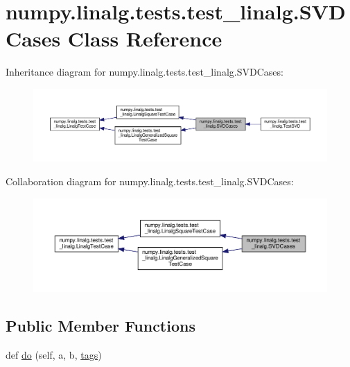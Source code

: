 \hypertarget{classnumpy_1_1linalg_1_1tests_1_1test__linalg_1_1SVDCases}{}\section{numpy.\+linalg.\+tests.\+test\+\_\+linalg.\+S\+V\+D\+Cases Class Reference}
\label{classnumpy_1_1linalg_1_1tests_1_1test__linalg_1_1SVDCases}


Inheritance diagram for numpy.\+linalg.\+tests.\+test\+\_\+linalg.\+S\+V\+D\+Cases\+:
\nopagebreak
\begin{figure}[H]
\begin{center}
\leavevmode
\includegraphics[width=350pt]{classnumpy_1_1linalg_1_1tests_1_1test__linalg_1_1SVDCases__inherit__graph}
\end{center}
\end{figure}


Collaboration diagram for numpy.\+linalg.\+tests.\+test\+\_\+linalg.\+S\+V\+D\+Cases\+:
\nopagebreak
\begin{figure}[H]
\begin{center}
\leavevmode
\includegraphics[width=350pt]{classnumpy_1_1linalg_1_1tests_1_1test__linalg_1_1SVDCases__coll__graph}
\end{center}
\end{figure}
\subsection*{Public Member Functions}
\begin{DoxyCompactItemize}
\item 
def \hyperlink{classnumpy_1_1linalg_1_1tests_1_1test__linalg_1_1SVDCases_a15c07cc228ee81bd83669e3379210629}{do} (self, a, b, \hyperlink{namespacenumpy_1_1linalg_1_1tests_1_1test__linalg_ac6a064918e74d701a7b5aac0ffefe1e7}{tags})
\end{DoxyCompactItemize}
